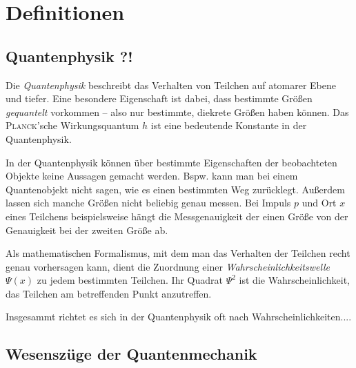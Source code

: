 

\chapter{Definitionen}


\section{Quantenphysik ?!}

Die \emph{Quantenphysik} beschreibt das Verhalten von Teilchen auf atomarer Ebene und tiefer. Eine besondere Eigenschaft ist dabei, dass bestimmte Größen \emph{gequantelt} vorkommen -- also nur bestimmte, diekrete Größen haben können. Das \textsc{Planck}'sche Wirkungsquantum $h$ ist eine bedeutende Konstante in der Quantenphysik.

In der Quantenphysik können über bestimmte Eigenschaften der beobachteten Objekte keine Aussagen gemacht werden. Bspw. kann man bei einem Quantenobjekt nicht sagen, wie es einen bestimmten Weg zurücklegt. Außerdem lassen sich manche Größen nicht beliebig genau messen. Bei Impuls \(p\) und Ort \(x\) eines Teilchens beispielsweise hängt die Messgenauigkeit der einen Größe von der Genauigkeit bei der zweiten Größe ab.

Als mathematischen Formalismus, mit dem man das Verhalten der Teilchen recht genau vorhersagen kann, dient die Zuordnung einer \emph{Wahrscheinlichkeitswelle} $\Psi(x)$ zu jedem bestimmten Teilchen. Ihr Quadrat $\Psi^2$ ist die Wahrscheinlichkeit, das Teilchen am betreffenden Punkt anzutreffen.

Insgesammt richtet es sich in der Quantenphysik oft nach Wahrscheinlichkeiten....


\section{Wesenszüge der Quantenmechanik}

